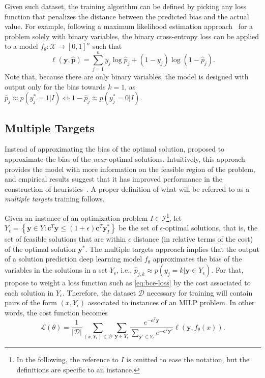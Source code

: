 Given such dataset, the training algorithm can be defined by picking any loss function that penalizes the distance between the predicted bias and the actual value.
For example, following a maximum likelihood estimation approach~\cite{goodfellowQualitativelyCharacterizingNeural2015} for a problem solely with binary variables, the binary cross-entropy loss can be applied to a model $f_{\theta}: \mathcal{X} \longrightarrow \left[ 0,1 \right]^n$ such that
\begin{equation}\label{eq:bce-loss}
    \ell(\bm{y}, \hat{\bm{p}}) = \sum_{j=1}^{n} y_j \log \hat{p}_j + (1-y_j) \log (1 - \hat{p}_j)
.\end{equation}
Note that, because there are only binary variables, the model is designed with output only for the bias towards $k=1$, as $\hat{p}_j\approx p(y_j^*=1|I) \iff 1-\hat{p}_j\approx p(y_j^*=0|I)$.


\subsection{Multiple Targets}

Instead of approximating the bias of the optimal solution,  proposed to approximate the bias of the \emph{near}-optimal solutions.
Intuitively, this approach provides the model with more information on the feasible region of the problem, and empirical results suggest that it has improved performance in the construction of heuristics~\cite{khalilMIPGNNDataDrivenFramework2022,hanGNNGuidedPredictandSearchFramework2023}.
A proper definition of what will be referred to as a \emph{multiple targets} training follows.

Given an instance of an optimization problem $I\in \mathcal{I}$\footnote{In the following, the reference to $I$ is omitted to ease the notation, but the definitions are specific to an instance.}, let $Y_\epsilon = \left\{ \bm{y} \in Y: \bm{c}^T\bm{y} \le (1+\epsilon) \bm{c}^T\bm{y}^*_{I} \right\}$ be the set of $\epsilon$-optimal solutions, that is, the set of feasible solutions that are within $\epsilon$ distance (in relative terms of the cost) of the optimal solution $\bm{y}^*$.
The multiple targets approach implies that the output of a solution prediction deep learning model $f_{\theta}$ approximates the bias of the variables in the solutions in a set $Y_\epsilon$, i.e., $\hat{p}_{j,k} \approx p(y_j = k | \bm{y} \in Y_\epsilon)$.
For that,  propose to weight a loss function such as \eqref{eq:bce-loss} by the cost associated to each solution in $Y_\epsilon$.
Therefore, the dataset $\mathcal{D}$ necessary for training will contain pairs of the form $(x,Y_\epsilon)$ associated to instances of an MILP problem.
In other words, the cost function becomes \[
    \mathcal{L}(\theta) = \frac{1}{|\mathcal{D}|} \sum_{(x,Y_\epsilon)\in \mathcal{D}} \sum_{\bm{y}\in Y_\epsilon}  \frac{e^{-\bm{c}^T \bm{y}}}{\sum_{\bm{y}'\in Y_\epsilon} e^{-\bm{c}^T \bm{y}'}} \ell(\bm{y},f_\theta(x))
.\] 


